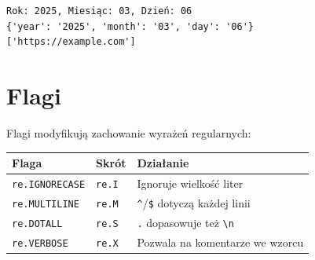 \documentclass[
  polish,
  letterpaper,
  DIV=11,
  numbers=noendperiod]{scrreprt}
\newcounter{none} %
\begin{document}
\begin{verbatim}
Rok: 2025, Miesiąc: 03, Dzień: 06
{'year': '2025', 'month': '03', 'day': '06'}
['https://example.com']
\end{verbatim}

\section{Flagi}\label{flagi}

Flagi modyfikują zachowanie wyrażeń regularnych:

{\def\LTcaptype{none} %
\begin{longtable}[]{@{}lll@{}}
\toprule\noalign{}
Flaga & Skrót & Działanie \\
\midrule\noalign{}
\endhead
\bottomrule\noalign{}
\endlastfoot
\texttt{re.IGNORECASE} & \texttt{re.I} & Ignoruje wielkość liter \\
\texttt{re.MULTILINE} & \texttt{re.M} & \texttt{\^{}}/\texttt{\$}
dotyczą każdej linii \\
\texttt{re.DOTALL} & \texttt{re.S} & \texttt{.} dopasowuje też
\texttt{\textbackslash{}n} \\
\texttt{re.VERBOSE} & \texttt{re.X} & Pozwala na komentarze we wzorcu \\
\end{longtable}
}
\end{document}
